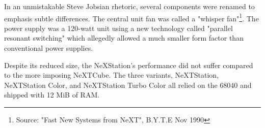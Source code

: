 \par
\vspace{-5pt}
In an unmistakable Steve Jobsian rhetoric, several components were renamed to emphasis subtle differences. The central unit fan was called a "whisper fan"\footnote{Source: "Fast New Systems from NeXT", B.Y.T.E Nov 1990}.  The power supply was a 120-watt unit using a new technology called "parallel resonant switching" which allegedly allowed a much smaller form factor than conventional power supplies.\\
\par
Despite its reduced size, the NeXStation's performance did not suffer compared to the more imposing NeXTCube. The three variants, NeXTStation, NeXTStation Color, and NeXTStation Turbo Color all relied on the 68040 and shipped with 12 MiB of RAM.\\
\par
{}
\pagebreak









